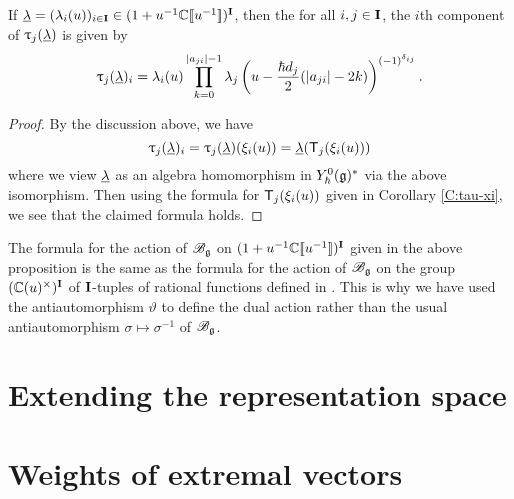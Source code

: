 \begin{proposition}\label{P:Tan-formula}
    If $\ul = (\lambda_i(u))_{i\in\I}\in (1+u^{-1}\C\db{u^{-1}})^\I$, then the for all $i,j\in\I$, the $i$th component of $\braid_j(\ul)$ is given by
    \[\braid_j(\ul)_i = \lambda_i(u)\prod_{k=0}^{\abs{a_{ji}}-1}\lambda_j\left(u-\frac{\hbar d_j}{2}(\abs{a_{ji}}-2k)\right)^{(-1)^{\delta_{ij}}}.\]
\end{proposition}
\begin{proof}
    By the discussion above, we have
    \[\braid_j(\ul)_i = \braid_j(\ul)(\xi_i(u)) = \ul(\mbraid_j(\xi_i(u)))\]
    where we view $\ul$ as an algebra homomorphism in $\Yhg[0]^*$ via the above isomorphism.
    Then using the formula for $\mbraid_j(\xi_i(u))$ given in Corollary \ref{C:tau-xi}, we see that the claimed formula holds.
\end{proof}

The formula for the action of $\Bg$ on $(1+u^{-1}\C\db{u^{-1}})^\I$ given in the above proposition is the same as the formula for the action of $\Bg$ on the group $(\C(u)^\times)^\I$ of $\I$-tuples of rational functions defined in \cite[Prop. 3.1]{tan_braid_2015}.
This is why we have used the antiautomorphism $\vartheta$ to define the dual action rather than the usual antiautomorphism $\sigma\mapsto\sigma^{-1}$ of $\Bg$.


\section{Extending the representation space}


\section{Weights of extremal vectors}
